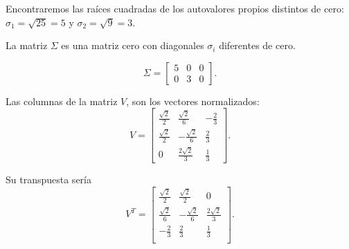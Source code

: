 \begin{frame}
	\begin{solution}
		Encontraremos las raíces cuadradas de los autovalores propios
		distintos de cero: $\sigma_{1}=\sqrt{25}=5$ y  $\sigma_{2}=\sqrt{9}=3$.

		La matriz $\Sigma$ es una matriz cero con diagonales $\sigma_{i}$
		diferentes de cero.

		\begin{equation*}
			\Sigma=
			\begin{bmatrix}
				5 & 0 & 0 \\
				0 & 3 & 0
			\end{bmatrix}.
		\end{equation*}

		Las columnas de la matriz $V$, son los vectores normalizados:
		\begin{equation*}
			V =
			\begin{bmatrix}
				\frac{\sqrt{2}}{2} & \frac{\sqrt{2}}{6}  & -\frac{2}{3} \\
				\frac{\sqrt{2}}{2} & -\frac{\sqrt{2}}{6} & \frac{2}{3}  \\
				0                  & \frac{2\sqrt{2}}{3} & \frac{1}{3}
			\end{bmatrix}.
		\end{equation*}

		Su transpuesta sería
		\begin{equation*}
			V^{T} =
			\begin{bmatrix}
				\frac{\sqrt{2}}{2} & \frac{\sqrt{2}}{2}  & 0                   \\
				\frac{\sqrt{2}}{6} & -\frac{\sqrt{2}}{6} & \frac{2\sqrt{2}}{3} \\
				-\frac{2}{3}       & \frac{2}{3}         & \frac{1}{3}         \\
			\end{bmatrix}.
		\end{equation*}
	\end{solution}
\end{frame}

